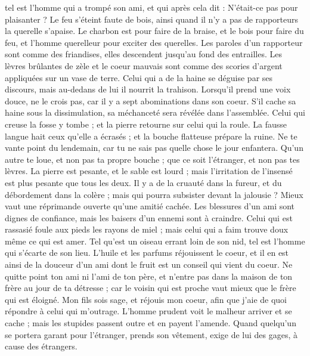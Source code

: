 \begin{multicols}{2}
tel est l'homme qui a trompé son ami, et qui après cela dit : N’était-ce pas pour plaisanter ?
Le feu s'éteint faute de bois, ainsi quand il n'y a pas de rapporteurs la querelle s'apaise.
Le charbon est pour faire de la braise, et le bois pour faire du feu, et l'homme querelleur pour exciter des querelles.
Les paroles d'un rapporteur sont comme des friandises, elles descendent jusqu'au fond des entrailles.
Les lèvres brûlantes de zèle et le coeur mauvais sont comme des scories d’argent appliquées sur un vase de terre.
Celui qui a de la haine se déguise par ses discours, mais au-dedans de lui il nourrit la trahison.
Lorsqu’il prend une voix douce, ne le crois pas, car il y a sept abominations dans son coeur.
S’il cache sa haine sous la dissimulation, sa méchanceté sera révélée dans l'assemblée.
Celui qui creuse la fosse y tombe ; et la pierre retourne sur celui qui la roule.
La fausse langue hait ceux qu'elle a écrasés ; et la bouche flatteuse prépare la ruine.
\VerseOne{}Ne te vante point du lendemain, car tu ne sais pas quelle chose le jour enfantera.
Qu'un autre te loue, et non pas ta propre bouche ; que ce soit l'étranger, et non pas tes lèvres.
La pierre est pesante, et le sable est lourd ; mais l’irritation de l’insensé est plus pesante que tous les deux.
Il y a de la cruauté dans la fureur, et du débordement dans la colère ; mais qui pourra subsister devant la jalousie ?
Mieux vaut une réprimande ouverte qu'une amitié cachée.
Les blessures d’un ami sont dignes de confiance, mais les baisers d’un ennemi sont à craindre.
Celui qui est rassasié foule aux pieds les rayons de miel ; mais celui qui a faim trouve doux même ce qui est amer.
Tel qu'est un oiseau errant loin de son nid, tel est l'homme qui s'écarte de son lieu.
L'huile et les parfums réjouissent le coeur, et il en est ainsi de la douceur d'un ami dont le fruit est un conseil qui vient du coeur.
Ne quitte point ton ami ni l'ami de ton père, et n'entre pas dans la maison de ton frère au jour de ta détresse ; car le voisin qui est proche vaut mieux que le frère qui est éloigné.
Mon fils sois sage, et réjouis mon coeur, afin que j'aie de quoi répondre à celui qui m’outrage.
L'homme prudent voit le malheur arriver et se cache ; mais les stupides passent outre et en payent l'amende.
Quand quelqu'un se portera garant pour l'étranger, prends son vêtement, exige de lui des gages, à cause des étrangers.

\end{multicols}
